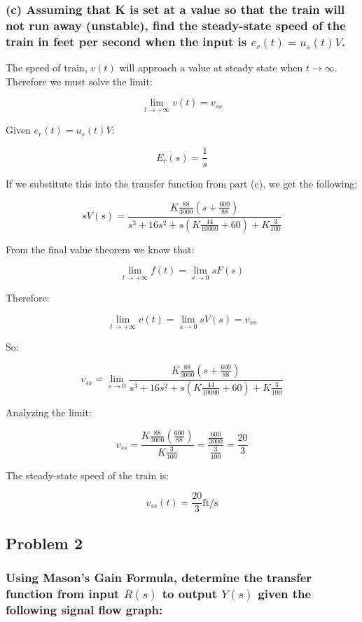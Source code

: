 \documentclass[12pt, letterpaper]{../assignment}
\begin{document}
\subsubsection*{(c) Assuming that K is set at a value so that the train will not run away (unstable),
find the steady-state speed of the train in feet per second when the input is $e_r(t) = u_s(t) V$.}

The speed of train, $v(t)$ will approach a value at steady state when $t \rightarrow \infty$.
Therefore we must solve the limit:

$$ \lim_{t\to+\infty} v(t) = v_{ss} $$

Given $e_r(t) = u_s(t) V$:

$$E_r(s) = \frac{1}{s}$$

If we substitute this into the transfer function from part (c), we get the following:

$$ s V(s) = 
\frac{K \frac{88}{3000}\left(s + \frac{600}{88}\right)}{s^3+16s^2 + s \left(K\frac{44}{10000}+ 60\right) + K \frac{3}{100} } $$

From the final value theorem we know that:

$$ \lim_{t\to+\infty} f(t) = \lim_{s\to 0} s F(s) $$

Therefore:

$$ \lim_{t\to+\infty} v(t) = \lim_{s\to 0} s V(s) = v_{ss} $$

So:

$$ v_{ss} = \lim_{s\to 0} \frac{K \frac{88}{3000}\left(s + \frac{600}{88}\right)}{s^3+16s^2 + s \left(K\frac{44}{10000}+ 60\right) + K \frac{3}{100} } $$

Analyzing the limit:

$$ v_{ss} = \frac{K \frac{88}{3000}\left(\frac{600}{88}\right)}{K \frac{3}{100} } =
\frac{\frac{600}{3000}}{\frac{3}{100} } = \frac{20}{3}  $$

The steady-state speed of the train is:

\begin{answer}
$$ v_{ss}(t) = \frac{20}{3} \text{ft/s}  $$
\end{answer}

\subsection*{Problem 2}

\subsubsection*{Using Mason's Gain Formula,
determine the transfer function from input $R(s)$ to output $Y(s)$ given the following signal flow graph:}
\end{document}

